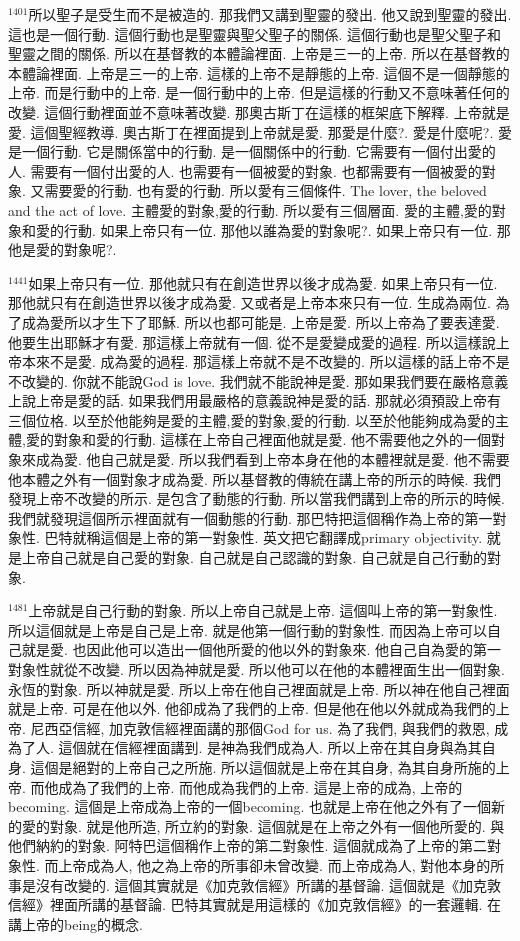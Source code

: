\documentclass{book}
\begin{document}
$^{1401}$所以聖子是受生而不是被造的.
那我們又講到聖靈的發出.
他又說到聖靈的發出.
這也是一個行動.
這個行動也是聖靈與聖父聖子的關係.
這個行動也是聖父聖子和聖靈之間的關係.
所以在基督教的本體論裡面.
上帝是三一的上帝.
所以在基督教的本體論裡面.
上帝是三一的上帝.
這樣的上帝不是靜態的上帝.
這個不是一個靜態的上帝.
而是行動中的上帝.
是一個行動中的上帝.
但是這樣的行動又不意味著任何的改變.
這個行動裡面並不意味著改變.
那奧古斯丁在這樣的框架底下解釋.
上帝就是愛.
這個聖經教導.
奧古斯丁在裡面提到上帝就是愛.
那愛是什麼?.
愛是什麼呢?.
愛是一個行動.
它是關係當中的行動.
是一個關係中的行動.
它需要有一個付出愛的人.
需要有一個付出愛的人.
也需要有一個被愛的對象.
也都需要有一個被愛的對象.
又需要愛的行動.
也有愛的行動.
所以愛有三個條件.
The lover, the beloved and the act of love.
主體愛的對象,愛的行動.
所以愛有三個層面.
愛的主體,愛的對象和愛的行動.
如果上帝只有一位.
那他以誰為愛的對象呢?.
如果上帝只有一位.
那他是愛的對象呢?.

$^{1441}$如果上帝只有一位.
那他就只有在創造世界以後才成為愛.
如果上帝只有一位.
那他就只有在創造世界以後才成為愛.
又或者是上帝本來只有一位.
生成為兩位.
為了成為愛所以才生下了耶穌.
所以也都可能是.
上帝是愛.
所以上帝為了要表達愛.
他要生出耶穌才有愛.
那這樣上帝就有一個.
從不是愛變成愛的過程.
所以這樣說上帝本來不是愛.
成為愛的過程.
那這樣上帝就不是不改變的.
所以這樣的話上帝不是不改變的.
你就不能說God is love.
我們就不能說神是愛.
那如果我們要在嚴格意義上說上帝是愛的話.
如果我們用最嚴格的意義說神是愛的話.
那就必須預設上帝有三個位格.
以至於他能夠是愛的主體,愛的對象,愛的行動.
以至於他能夠成為愛的主體,愛的對象和愛的行動.
這樣在上帝自己裡面他就是愛.
他不需要他之外的一個對象來成為愛.
他自己就是愛.
所以我們看到上帝本身在他的本體裡就是愛.
他不需要他本體之外有一個對象才成為愛.
所以基督教的傳統在講上帝的所示的時候.
我們發現上帝不改變的所示.
是包含了動態的行動.
所以當我們講到上帝的所示的時候.
我們就發現這個所示裡面就有一個動態的行動.
那巴特把這個稱作為上帝的第一對象性.
巴特就稱這個是上帝的第一對象性.
英文把它翻譯成primary objectivity.
就是上帝自己就是自己愛的對象.
自己就是自己認識的對象.
自己就是自己行動的對象.

$^{1481}$上帝就是自己行動的對象.
所以上帝自己就是上帝.
這個叫上帝的第一對象性.
所以這個就是上帝是自己是上帝.
就是他第一個行動的對象性.
而因為上帝可以自己就是愛.
也因此他可以造出一個他所愛的他以外的對象來.
他自己自為愛的第一對象性就從不改變.
所以因為神就是愛.
所以他可以在他的本體裡面生出一個對象.
永恆的對象.
所以神就是愛.
所以上帝在他自己裡面就是上帝.
所以神在他自己裡面就是上帝.
可是在他以外.
他卻成為了我們的上帝.
但是他在他以外就成為我們的上帝.
尼西亞信經, 加克敦信經裡面講的那個God for us.
為了我們, 與我們的救恩, 成為了人.
這個就在信經裡面講到.
是神為我們成為人.
所以上帝在其自身與為其自身.
這個是絕對的上帝自己之所施.
所以這個就是上帝在其自身, 為其自身所施的上帝.
而他成為了我們的上帝.
而他成為我們的上帝.
這是上帝的成為, 上帝的becoming.
這個是上帝成為上帝的一個becoming.
也就是上帝在他之外有了一個新的愛的對象.
就是他所造, 所立約的對象.
這個就是在上帝之外有一個他所愛的.
與他們納約的對象.
阿特巴這個稱作上帝的第二對象性.
這個就成為了上帝的第二對象性.
而上帝成為人, 他之為上帝的所事卻未曾改變.
而上帝成為人, 對他本身的所事是沒有改變的.
這個其實就是《加克敦信經》所講的基督論.
這個就是《加克敦信經》裡面所講的基督論.
巴特其實就是用這樣的《加克敦信經》的一套邏輯.
在講上帝的being的概念.
\end{document}
